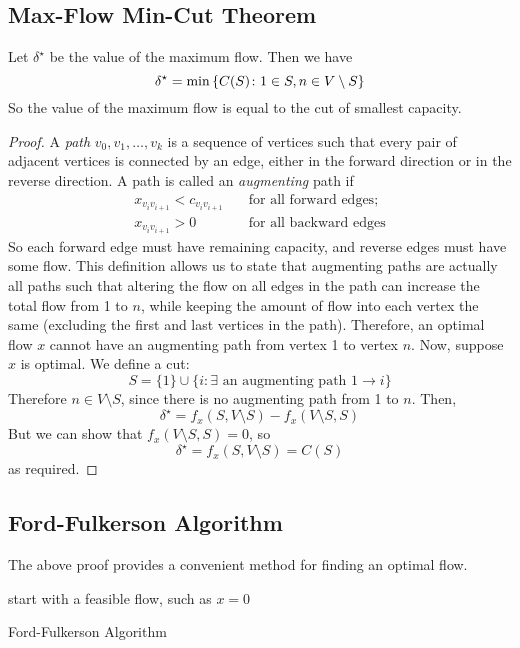\subsection{Max-Flow Min-Cut Theorem}
\begin{theorem}
    Let \( \delta^\star \) be the value of the maximum flow.
    Then we have
    \[ \delta^\star = \min \qty{ C(S) \colon 1 \in S, n \in V \setminus S } \]
    So the value of the maximum flow is equal to the cut of smallest capacity.
\end{theorem}
\begin{proof}
    A \textit{path} \( v_0, v_1, \dots, v_k \) is a sequence of vertices such that every pair of adjacent vertices is connected by an edge, either in the forward direction or in the reverse direction.
    A path is called an \textit{augmenting} path if
    \begin{align*}
        x_{v_i v_{i+1}} < c_{v_i v_{i+1}} &\quad \text{for all forward edges}; \\
        x_{v_i v_{i+1}} > 0 &\quad \text{for all backward edges}
    \end{align*}
    So each forward edge must have remaining capacity, and reverse edges must have some flow.
    This definition allows us to state that augmenting paths are actually all paths such that altering the flow on all edges in the path can increase the total flow from 1 to \( n \), while keeping the amount of flow into each vertex the same (excluding the first and last vertices in the path).
    Therefore, an optimal flow \( x \) cannot have an augmenting path from vertex 1 to vertex \( n \).
    Now, suppose \( x \) is optimal. We define a cut:
    \[ S = \{ 1 \} \cup \{ i \colon \exists \text{ an augmenting path } 1 \to i \} \]
    Therefore \( n \in V \setminus S \), since there is no augmenting path from 1 to \( n \).
    Then,
    \[ \delta^\star = f_x(S, V \setminus S) - f_x(V \setminus S, S) \]
    But we can show that \( f_x(V \setminus S, S) = 0 \), so
    \[ \delta^\star = f_x(S, V \setminus S) = C(S) \]
    as required.
\end{proof}

\subsection{Ford-Fulkerson Algorithm}
The above proof provides a convenient method for finding an optimal flow.

\begin{algorithm*}[H]
	\SetAlgoLined{}
	start with a feasible flow, such as \(x = 0\)\;
	\caption{Ford-Fulkerson Algorithm}
\end{algorithm*}

